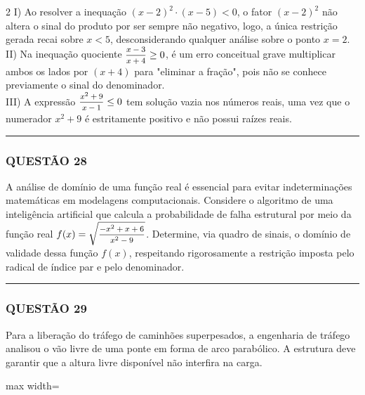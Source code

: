 \documentclass[twoside, 10pt, a4paper]{article}
\begin{document}
\begin{multicols*}{2}
I) Ao resolver a inequação $ (x - 2)^2 \cdot (x - 5) < 0 $, o fator $ (x - 2)^2 $ não altera o sinal do produto por ser sempre não negativo, logo, a única restrição gerada recai sobre $ x < 5 $, desconsiderando qualquer análise sobre o ponto $ x = 2 $.\\[0.3cm]
II) Na inequação quociente $ \mfrac{x - 3}{x + 4} \ge 0 $, é um erro conceitual grave multiplicar ambos os lados por $ (x + 4) $ para "eliminar a fração", pois não se conhece previamente o sinal do denominador.\\[0.3cm]
III) A expressão $ \mfrac{x^2 + 9}{x - 1} \le 0 $ tem solução vazia nos números reais, uma vez que o numerador $ x^2 + 9 $ é estritamente positivo e não possui raízes reais.

\vspace{0cm} \noindent\textcolor{CorLinha}{\rule{\linewidth}{0.5pt}} \vspace{-0.2cm}
\subsubsection*{QUESTÃO 28}
A análise de domínio de uma função real é essencial para evitar indeterminações matemáticas em modelagens computacionais. Considere o algoritmo de uma inteligência artificial que calcula a probabilidade de falha estrutural por meio da função real $ f(x) = \sqrt{\mfrac{-x^2 + x + 6}{x^2 - 9}} $. Determine, via quadro de sinais, o domínio de validade dessa função $ f(x) $, respeitando rigorosamente a restrição imposta pelo radical de índice par e pelo denominador.

\vspace{0cm} \noindent\textcolor{CorLinha}{\rule{\linewidth}{0.5pt}} \vspace{-0.2cm}
\subsubsection*{QUESTÃO 29}
Para a liberação do tráfego de caminhões superpesados, a engenharia de tráfego analisou o vão livre de uma ponte em forma de arco parabólico. A estrutura deve garantir que a altura livre disponível não interfira na carga.

\begin{center}
\begin{adjustbox}{max width=\linewidth}
\end{adjustbox}
\end{center}
\end{multicols*}
\end{document}

